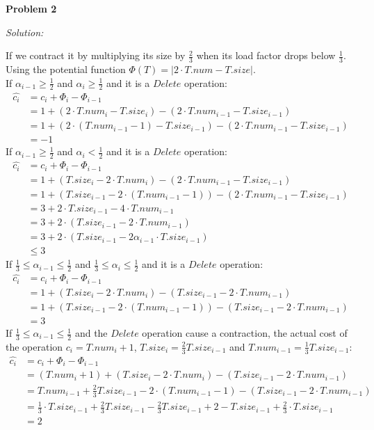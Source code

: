 \documentclass[12pt,letterpaper]{article}
\def\pp{\par\noindent}
\newcommand{\problem}[1]{ \bigskip \pp \textbf{Problem #1}\par}
\newcommand{\solution}{\textit{Solution:}\par}
\begin{document}
\problem{2}
\solution
If we contract it by multiplying its size by $\frac{2}{3}$ when its load factor drops below $\frac{1}{3}$. Using the potential function $\Phi(T) = |2\cdot T.num - T.size|$. \\
If $\alpha_{i-1} \ge \frac{1}{2}$ and $\alpha_{i} \ge \frac{1}{2}$ and it is a $Delete$ operation:
\begin{align*}
\widehat{c_i} &= c_i + \Phi_{i} - \Phi_{i-1} \\
&= 1 + (2 \cdot T.num_{i} - T.size_{i}) - (2 \cdot T.num_{i-1} - T.size_{i-1}) \\
&= 1 + (2 \cdot (T.num_{i-1} - 1) - T.size_{i-1}) - (2 \cdot T.num_{i-1} - T.size_{i-1}) \\
&= -1
\end{align*}
If $\alpha_{i-1} \ge \frac{1}{2}$ and $\alpha_{i} < \frac{1}{2}$ and it is a $Delete$ operation:
\begin{align*}
\widehat{c_i} &= c_i + \Phi_{i} - \Phi_{i-1} \\
&= 1 + (T.size_{i} - 2 \cdot T.num_{i} ) - (2 \cdot T.num_{i-1} - T.size_{i-1}) \\
&= 1 + (T.size_{i-1} - 2 \cdot (T.num_{i-1} - 1)) - (2 \cdot T.num_{i-1} - T.size_{i-1}) \\
&= 3 + 2 \cdot T.size_{i-1} - 4 \cdot T.num_{i-1} \\
&= 3 + 2 \cdot (T.size_{i-1} - 2 \cdot T.num_{i-1}) \\
&= 3 + 2 \cdot (T.size_{i-1} - 2 \alpha_{i-1} \cdot T.size_{i-1}) \\
&\le 3
\end{align*}
If $\frac{1}{3} \le \alpha_{i-1} \le \frac{1}{2}$ and $\frac{1}{3} \le \alpha_{i} \le \frac{1}{2}$ and it is a $Delete$ operation:
\begin{align*}
\widehat{c_i} &= c_i + \Phi_{i} - \Phi_{i-1} \\
&= 1 + ( T.size_{i} - 2 \cdot T.num_{i} ) - ( T.size_{i-1} - 2 \cdot T.num_{i-1} ) \\
&= 1 + ( T.size_{i-1} - 2 \cdot (T.num_{i-1} - 1) ) - ( T.size_{i-1} - 2 \cdot T.num_{i-1} ) \\
&= 3
\end{align*}
If $\frac{1}{3} \le \alpha_{i-1} \le \frac{1}{2}$ and the $Delete$ operation cause a contraction, the actual cost of the operation $c_i = T.num_{i} + 1$, $T.size_{i} = \frac{2}{3} T.size_{i-1}$ and $T.num_{i-1} = \frac{1}{3} T.size_{i-1}$:
\begin{align*}
\widehat{c_i} &= c_i + \Phi_{i} - \Phi_{i-1} \\
&= (T.num_{i} +1)+ ( T.size_{i} - 2 \cdot T.num_{i} ) - ( T.size_{i-1} - 2 \cdot T.num_{i-1} ) \\
&= T.num_{i-1} + \frac{2}{3} T.size_{i-1} - 2 \cdot (T.num_{i-1} - 1) - ( T.size_{i-1} - 2 \cdot T.num_{i-1} ) \\
&= \frac{1}{3} \cdot T.size_{i-1} + \frac{2}{3} T.size_{i-1} - \frac{2}{3} T.size_{i-1} + 2 - T.size_{i-1} + \frac{2}{3} \cdot T.size_{i-1} \\
&= 2
\end{align*}
\end{document}
